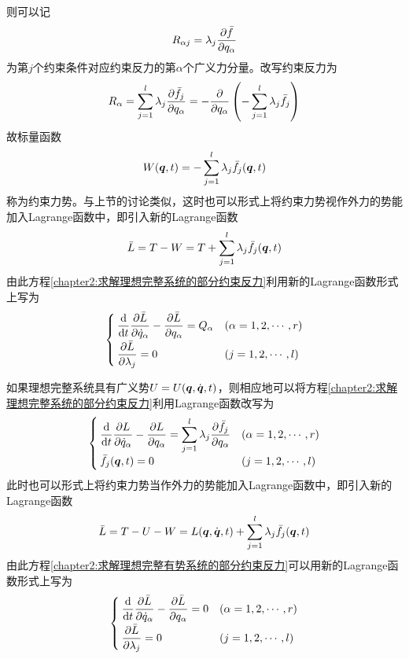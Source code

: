 则可以记
\begin{equation}
	R_{\alpha j} = \lambda_j \frac{\partial \bar{f}}{\partial q_\alpha}
\end{equation}
为第$j$个约束条件对应约束反力的第$\alpha$个广义力分量。改写约束反力为
\begin{equation}
	R_\alpha = \sum_{j=1}^l \lambda_j \frac{\partial \bar{f}_j}{\partial q_\alpha} = -\frac{\partial}{\partial q_\alpha} \left(-\sum_{j=1}^l \lambda_j \bar{f}_j\right)
\end{equation}
故标量函数
\begin{equation}
	W(\boldsymbol{q},t) = -\sum_{j=1}^l \lambda_j \bar{f}_j(\boldsymbol{q},t)
\end{equation}
称为{\heiti 约束力势}。与上节的讨论类似，这时也可以形式上将约束力势视作外力的势能加入Lagrange函数中，即引入新的Lagrange函数
\begin{equation}
	\bar{L} = T-W = T + \sum_{j=1}^l \lambda_j \bar{f}_j (\boldsymbol{q},t)
\end{equation}
由此方程\eqref{chapter2:求解理想完整系统的部分约束反力}利用新的Lagrange函数形式上写为
\begin{equation}
\begin{cases}
	\displaystyle \frac{\mathrm{d}}{\mathrm{d} t} \frac{\partial \bar{L}}{\partial \dot{q}_\alpha} - \frac{\partial \bar{L}}{\partial q_\alpha} = Q_\alpha & (\alpha=1,2,\cdots,r) \\[1.5ex]
	\dfrac{\partial \bar{L}}{\partial \lambda_j} = 0 & (j=1,2,\cdots,l)
\end{cases}
\end{equation}

如果理想完整系统具有广义势$U=U(\boldsymbol{q},\dot{\boldsymbol{q}},t)$，则相应地可以将方程\eqref{chapter2:求解理想完整系统的部分约束反力}利用Lagrange函数改写为
\begin{equation}
\begin{cases}
	\displaystyle \frac{\mathrm{d}}{\mathrm{d} t} \frac{\partial L}{\partial \dot{q}_\alpha} - \frac{\partial L}{\partial q_\alpha} = \sum_{j=1}^l \lambda_j \frac{\partial \bar{f}_j}{\partial q_\alpha} & (\alpha=1,2,\cdots,r) \\
	\bar{f}_j(\boldsymbol{q},t) = 0 & (j=1,2,\cdots,l)
\end{cases}
\label{chapter2:求解理想完整有势系统的部分约束反力}
\end{equation}
此时也可以形式上将约束力势当作外力的势能加入Lagrange函数中，即引入新的Lagrange函数
\begin{equation}
	\bar{L} = T-U-W = L(\boldsymbol{q},\dot{\boldsymbol{q}},t) + \sum_{j=1}^l \lambda_j \bar{f}_j (\boldsymbol{q},t)
\end{equation}
由此方程\eqref{chapter2:求解理想完整有势系统的部分约束反力}可以用新的Lagrange函数形式上写为
\begin{equation}
\begin{cases}
	\displaystyle \frac{\mathrm{d}}{\mathrm{d} t} \frac{\partial \bar{L}}{\partial \dot{q}_\alpha} - \frac{\partial \bar{L}}{\partial q_\alpha} = 0 & (\alpha =1,2,\cdots,r) \\[1.5ex]
	\displaystyle \frac{\partial \bar{L}}{\partial \lambda_j} = 0 & (j = 1,2,\cdots,l)
\end{cases}
\end{equation}

